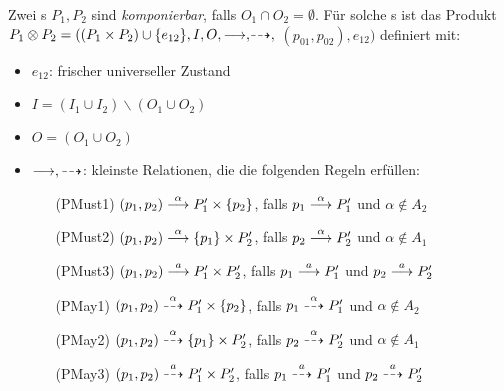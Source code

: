 \begin{Def}[Parallelprodukt]
  Zwei \MIA{}s $P_1,P_2$ sind \emph{komponierbar}, falls $O_1\cap
  O_2=\emptyset$. Für solche \MIA{}s ist das Produkt $P_1\otimes
  P_2=((P_1\times P_2)\cup \{e_{12}\}, I, O, {\must,} {\may,}$ $(p_{01}, p_{02}),
  e_{12})$ definiert mit: 
  \begin{itemize}
    \item $e_{12}$: frischer universeller Zustand
    \item $I=(I_1\cup I_2)\backslash (O_1\cup O_2)$
    \item $O=(O_1\cup O_2)$
    \item $\must, \may$: kleinste Relationen, die die
      folgenden Regeln erfüllen:
    \begin{itemize}
      \item[(PMust1)] $(p_1,p_2)\must[\alpha] P_1'\times \{p_2\}$, falls
        $p_1\must[\alpha] P_1'$ und $\alpha\notin A_2$
      \item[(PMust2)] $(p_1,p_2)\must[\alpha] \{p_1\}\times P_2'$, falls
        $p_2\must[\alpha] P_2'$ und $\alpha\notin A_1$
      \item[(PMust3)] $(p_1,p_2)\must[a] P_1'\times P_2'$, falls
        $p_1\must[a] P_1'$ und $p_2\must[a] P_2'$
      \item[(PMay1)] $(p_1,p_2)\may[\alpha] P_1'\times \{p_2\}$, falls
        $p_1\may[\alpha] P_1'$ und $\alpha\notin A_2$
      \item[(PMay2)] $(p_1,p_2)\may[\alpha] \{p_1\}\times P_2'$, falls
        $p_2\may[\alpha] P_2'$ und $\alpha\notin A_1$
      \item[(PMay3)] $(p_1,p_2)\may[a] P_1'\times P_2'$, falls
        $p_1\may[a] P_1'$ und $p_2\may[a] P_2'$
    \end{itemize}
  \end{itemize}
\end{Def}

